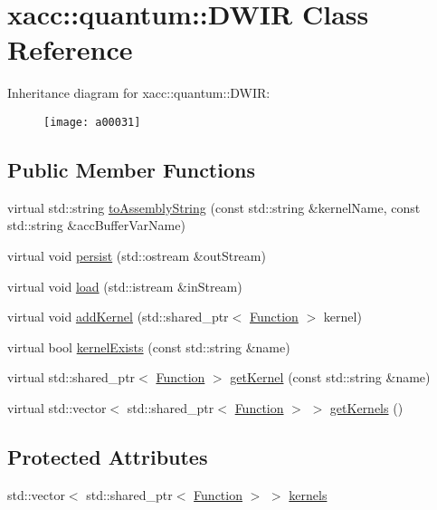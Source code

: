 \hypertarget{a00031}{}\section{xacc\+:\+:quantum\+:\+:D\+W\+IR Class Reference}
\label{a00031}
Inheritance diagram for xacc\+:\+:quantum\+:\+:D\+W\+IR\+:\begin{figure}[H]
\begin{center}
\leavevmode
\texttt{[image: a00031]}
\end{center}
\end{figure}
\subsection*{Public Member Functions}
\begin{DoxyCompactItemize}
\item 
virtual std\+::string \hyperlink{a00031_a880cb60197577ea31115331e3a030e3e}{to\+Assembly\+String} (const std\+::string \&kernel\+Name, const std\+::string \&acc\+Buffer\+Var\+Name)
\item 
virtual void \hyperlink{a00031_abcbfd0a4cf697843391c65cbd9a82080}{persist} (std\+::ostream \&out\+Stream)
\item 
virtual void \hyperlink{a00031_a8b388d719d565bb902c979807d3d0d47}{load} (std\+::istream \&in\+Stream)
\item 
virtual void \hyperlink{a00031_af1bef18e1e9568d1313b03149aab8c1b}{add\+Kernel} (std\+::shared\+\_\+ptr$<$ \hyperlink{a00039}{Function} $>$ kernel)
\item 
virtual bool \hyperlink{a00031_ab5e8861d3bc0845bb015af6208f5f396}{kernel\+Exists} (const std\+::string \&name)
\item 
virtual std\+::shared\+\_\+ptr$<$ \hyperlink{a00039}{Function} $>$ \hyperlink{a00031_a38d8bdd24250749bc38ad31f8512fcfc}{get\+Kernel} (const std\+::string \&name)
\item 
virtual std\+::vector$<$ std\+::shared\+\_\+ptr$<$ \hyperlink{a00039}{Function} $>$ $>$ \hyperlink{a00031_a66e22c5dc95ec46045476864012ad08f}{get\+Kernels} ()
\end{DoxyCompactItemize}
\subsection*{Protected Attributes}
\begin{DoxyCompactItemize}
\item 
std\+::vector$<$ std\+::shared\+\_\+ptr$<$ \hyperlink{a00039}{Function} $>$ $>$ \hyperlink{a00031_abcb04ec3a152c3f22e5a757a9aecabf2}{kernels}
\end{DoxyCompactItemize}


